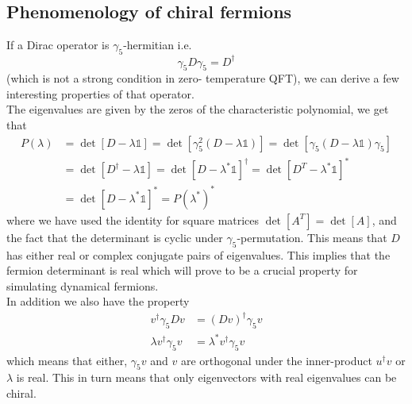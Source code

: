 \documentclass[a4paper,10pt]{book}
\begin{document}
\subsection{Phenomenology of chiral fermions}\label{sec:chiral_fermions_topCharge}
If a Dirac operator is $\gamma_5$-hermitian i.e.
\begin{equation}
\gamma_{5} D \gamma_{5}=D^{\dagger}
\end{equation}
(which is not a strong condition in zero- temperature QFT), we can derive a few interesting properties of that operator.\\The eigenvalues are given by the zeros of the characteristic polynomial, we get that
\begin{equation}
\begin{aligned}
P(\lambda) &=\operatorname{det}[D-\lambda \mathbb{1}]=\operatorname{det}\left[\gamma_{5}^{2}(D-\lambda \mathbb{1})\right]=\operatorname{det}\left[\gamma_{5}(D-\lambda \mathbb{1}) \gamma_{5}\right] \\
&=\operatorname{det}\left[D^{\dagger}-\lambda \mathbb{1}\right]=\operatorname{det}\left[D-\lambda^{*} \mathbb{1}\right]^{\dagger}=\operatorname{det}\left[D^T-\lambda^{*} \mathbb{1}\right]^{*}\\&=\operatorname{det}\left[D-\lambda^{*} \mathbb{1}\right]^{*}=P\left(\lambda^{*}\right)^{*}
\end{aligned}
\end{equation}
where we have used the identity for square matrices $\operatorname{det}\left[ A^T \right] = \operatorname{det}\left[ A \right]$, and the fact that the determinant is cyclic under $\gamma_5$-permutation. This means that $D$ has either real or complex conjugate pairs of eigenvalues. This implies that the fermion determinant is real which will prove to be a crucial property for simulating dynamical fermions.\\In addition we also have the property
\begin{equation}
\begin{aligned} 
v^\dagger \gamma_5Dv &= (Dv)^\dagger\gamma_5v\\\lambda v^\dagger \gamma_5v &=\lambda^*v^\dagger \gamma_5v 
\end{aligned}
\end{equation}
which means that either, $\gamma_5v $ and $v$ are orthogonal under the inner-product $u^\dagger v$ or $\lambda$ is real. This in turn means that only eigenvectors with real eigenvalues can be chiral.\\\\
\end{document}
